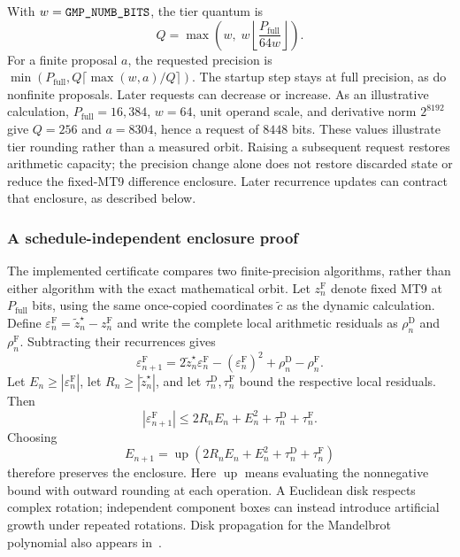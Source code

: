 With $w=\texttt{GMP\_NUMB\_BITS}$, the tier quantum is
\begin{equation}
 Q=\max\left(w,\;w\left\lfloor\frac{P_{\mathrm{full}}}{64w}\right\rfloor\right).
 \label{eq:dynamic-tier-quantum}
\end{equation}
For a finite proposal $a$, the requested precision is
$\min(P_{\mathrm{full}},Q\lceil\max(w,a)/Q\rceil)$.
The startup step stays at full precision, as do nonfinite proposals.
Later requests can decrease or increase. As an illustrative calculation,
$P_{\mathrm{full}}=16{,}384$, $w=64$, unit operand scale, and derivative norm
$2^{8192}$ give $Q=256$ and $a=8304$, hence a request of $8448$ bits.
These values illustrate tier rounding rather than a measured orbit.
Raising a subsequent request restores arithmetic capacity; the precision change
alone does not restore discarded state or reduce the fixed-MT9 difference enclosure.
Later recurrence updates can contract that enclosure, as described below.

\subsubsection{A schedule-independent enclosure proof}
\label{subsec:ref-orbit-dynamic-enclosure}

The implemented certificate compares two finite-precision algorithms, rather
than either algorithm with the exact mathematical orbit. Let $z_n^{\mathrm F}$
denote fixed MT9 at $P_{\mathrm{full}}$ bits, using the same once-copied
coordinates $\widetilde c$ as the dynamic calculation. Define
$\varepsilon_n^{\mathrm F}=\widetilde z_n^\star-z_n^{\mathrm F}$ and write
the complete local arithmetic residuals as $\rho_n^{\mathrm D}$ and
$\rho_n^{\mathrm F}$. Subtracting their recurrences gives
\[
 \varepsilon_{n+1}^{\mathrm F}
 =2\widetilde z_n^\star\varepsilon_n^{\mathrm F}
  -(\varepsilon_n^{\mathrm F})^2+\rho_n^{\mathrm D}-\rho_n^{\mathrm F}.
\]
Let $E_n\ge|\varepsilon_n^{\mathrm F}|$, let
$R_n\ge|\widetilde z_n^\star|$, and let
$\tau_n^{\mathrm D},\tau_n^{\mathrm F}$ bound the respective local residuals.
Then
\begin{equation}
 |\varepsilon_{n+1}^{\mathrm F}|
 \le2R_nE_n+E_n^2+\tau_n^{\mathrm D}+\tau_n^{\mathrm F}.
 \label{eq:dynamic-disk-inequality}
\end{equation}
Choosing
\begin{equation}
 E_{n+1}=\operatorname{up}
   (2R_nE_n+E_n^2+\tau_n^{\mathrm D}+\tau_n^{\mathrm F})
 \label{eq:dynamic-disk-update}
\end{equation}
therefore preserves the enclosure. Here $\operatorname{up}$ means evaluating
the nonnegative bound with outward rounding at each operation. A Euclidean
disk respects complex rotation; independent component boxes can instead
introduce artificial growth under repeated rotations. Disk propagation for
the Mandelbrot polynomial also appears in~\cite{MandelbrotNotes2018}.

